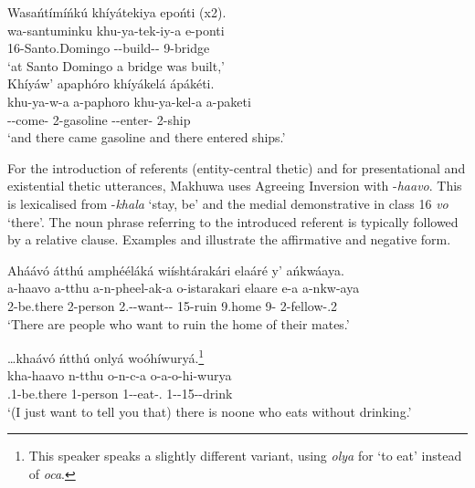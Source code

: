 \documentclass[output=paper]{langscibook}
\begin{document}
\ex
Wasańtímíńkú khíyátekiya epońti (x2).\\
\gll
wa-santuminku  khu-ya-tek-iy-a  e-ponti\\
16-Santo.Domingo  \NARR{}-\IPFV{}-build-\PASS{}-\FV{}  9-bridge\\
\glt
‘at Santo Domingo a bridge was built,’\\

\ex
Khíyáw’ apaphóro khíyákelá ápákéti.\\
\gll
khu-ya-w-a  a-paphoro  khu-ya-kel-a  a-paketi\\
\NARR{}-\IPFV{}-come-\FV{}  2-gasoline  \NARR{}-\IPFV{}-enter-\FV{}  2-ship\\
\glt
‘and there came gasoline and there entered ships.’\\


\z
\z

For the introduction of referents (entity-central thetic) and for presentational and existential thetic utterances, Makhuwa uses Agreeing Inversion with \mbox{-\textit{haavo}}. This is lexicalised from \nobreakdash-\textit{khala} ‘stay, be’ and the medial demonstrative in class 16 \textit{vo} ‘there’. The noun phrase referring to the introduced referent is typically followed by a relative clause. Examples  and  illustrate the affirmative and negative form.

\ea
\label{bkm:Ref95375476}
Aháávó átthú amphééláká wiíshtárakári elaáré y’ ańkwáaya.\\
\gll
a-haavo  a-tthu  a-n-pheel-ak-a  o-istarakari    elaare  e-a  a-nkw-aya \\
2\SM{}-be.there  2-person  2\SM{}.\SIT{}-\PRS{}-want-\DUR{}-\FV{}  15-ruin    9.home  9-\CONN{}  2-fellow{}-\POSS{}.2 \\
\glt
‘There are people who want to ruin the home of their mates.’\\

\z

\ea
\label{bkm:Ref95375477}
…khaávó ńtthú onlyá woóhíwuryá.\footnote{This speaker speaks a slightly different variant, using \textit{olya} for ‘to eat’ instead of \textit{oca}.}\\
\gll
kha-haavo  n-tthu  o-n-c-a  o-a-o-hi-wurya\\
\NEG{}.1\SM{}-be.there  1-person  1-\PRS{}-eat-\FV{}.\REL{}  1-\CONN{}-15-\NEG{}-drink\\
\glt
‘(I just want to tell you that) there is noone who eats without drinking.’\\
\end{document}
